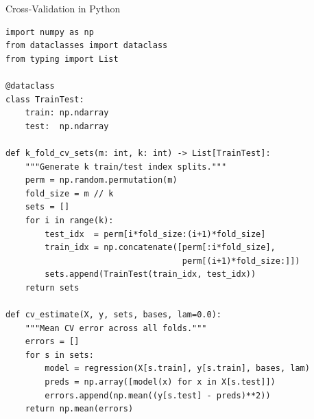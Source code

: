 \documentclass[aspectratio=169,10pt]{beamer}
\begin{document}
\begin{frame}[fragile]{Cross-Validation in Python}
\begin{lstlisting}[style=python, caption={k-fold cross-validation (Algorithm 17.10 equivalent)}]
import numpy as np
from dataclasses import dataclass
from typing import List

@dataclass
class TrainTest:
    train: np.ndarray
    test:  np.ndarray

def k_fold_cv_sets(m: int, k: int) -> List[TrainTest]:
    """Generate k train/test index splits."""
    perm = np.random.permutation(m)
    fold_size = m // k
    sets = []
    for i in range(k):
        test_idx  = perm[i*fold_size:(i+1)*fold_size]
        train_idx = np.concatenate([perm[:i*fold_size],
                                    perm[(i+1)*fold_size:]])
        sets.append(TrainTest(train_idx, test_idx))
    return sets

def cv_estimate(X, y, sets, bases, lam=0.0):
    """Mean CV error across all folds."""
    errors = []
    for s in sets:
        model = regression(X[s.train], y[s.train], bases, lam)
        preds = np.array([model(x) for x in X[s.test]])
        errors.append(np.mean((y[s.test] - preds)**2))
    return np.mean(errors)
\end{lstlisting}
\end{frame}
\end{document}
